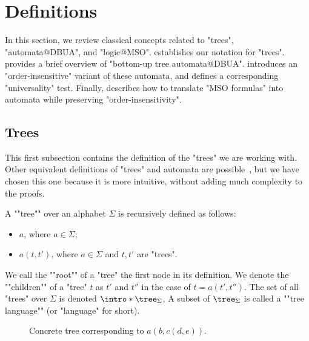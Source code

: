 \documentclass[a4paper,UKenglish,cleveref, autoref, thm-restate]{lipics-v2021}
\begin{document}
\section{Definitions} \label{sec:definitions}

In this section, we review classical concepts related to "trees", "automata@DBUA", and "logic@MSO".
 establishes our notation for "trees".
 provides a brief overview of "bottom-up tree automata@DBUA".
 introduces an "order-insensitive" variant of these automata, and
 defines a corresponding "universality" test.
Finally,  describes how to translate "MSO formulas" into automata while preserving "order-insensitivity".
\subsection{Trees}\label{sec:trees}

This first subsection contains the definition of the "trees" we are working with. Other equivalent definitions of "trees" and
automata are possible~\cite{Thomas1997, tata}, but we have chosen this one because it is more intuitive, without adding much complexity to the proofs.

\begin{definition}["Tree"]
	\AP A ""tree"" over an alphabet $\Sigma$ is recursively defined as follows:
	\begin{itemize}
		\item $a$, where $a \in \Sigma$;
		\item $a(t,t')$, where $a \in \Sigma$ and $t, t'$ are "trees".
	\end{itemize}
	We call the ""root"" of a "tree" the first node in its definition.
	We denote the ""children"" of a "tree" $t$ as $t'$ and $t''$ in the case of $t = a(t',t'')$.
	The set of all "trees" over $\Sigma$ is denoted $\intro* \tree_{\Sigma}$.
	A subset of $\tree_{\Sigma}$ is called a ""tree language"" (or "language" for short).
\end{definition}

\begin{figure}[h]
	\centering


	\caption{Concrete tree corresponding to $a(b, c(d, e))$.}
\end{figure}
\end{document}
